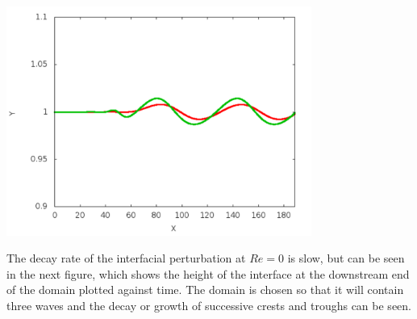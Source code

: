  
\begin{DoxyImage}
\includegraphics[width=0.75\textwidth]{animated_surface}
\end{DoxyImage}


The decay rate of the interfacial perturbation at $ Re = 0 $ is slow, but can be seen in the next figure, which shows the height of the interface at the downstream end of the domain plotted against time. The domain is chosen so that it will contain three waves and the decay or growth of successive crests and troughs can be seen.

